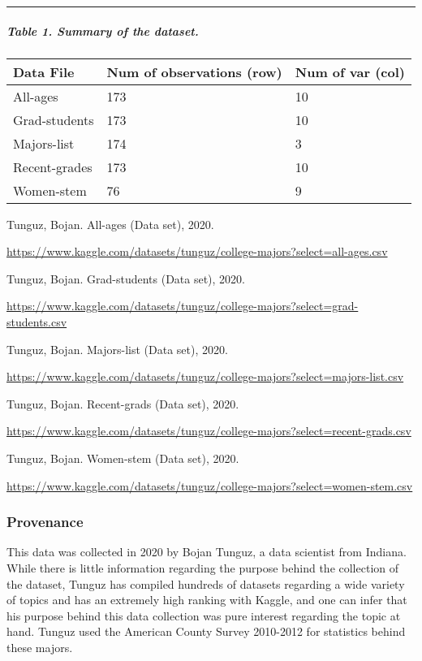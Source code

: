 \documentclass[
]{article}
\begin{document}
\begin{center}\rule{0.5\linewidth}{0.5pt}\end{center}

\hypertarget{table-1.-summary-of-the-dataset.}{%
\subparagraph{Table 1. Summary of the
dataset.}\label{table-1.-summary-of-the-dataset.}}

\begin{longtable}[]{@{}lll@{}}
\toprule()
Data File & Num of observations (row) & Num of var (col) \\
\midrule()
\endhead
All-ages & 173 & 10 \\
Grad-students & 173 & 10 \\
Majors-list & 174 & 3 \\
Recent-grades & 173 & 10 \\
Women-stem & 76 & 9 \\
\bottomrule()
\end{longtable}

Tunguz, Bojan. All-ages (Data set), 2020.

\url{https://www.kaggle.com/datasets/tunguz/college-majors?select=all-ages.csv}

Tunguz, Bojan. Grad-students (Data set), 2020.

\url{https://www.kaggle.com/datasets/tunguz/college-majors?select=grad-students.csv}

Tunguz, Bojan. Majors-list (Data set), 2020.

\url{https://www.kaggle.com/datasets/tunguz/college-majors?select=majors-list.csv}

Tunguz, Bojan. Recent-grads (Data set), 2020.

\url{https://www.kaggle.com/datasets/tunguz/college-majors?select=recent-grads.csv}

Tunguz, Bojan. Women-stem (Data set), 2020.

\url{https://www.kaggle.com/datasets/tunguz/college-majors?select=women-stem.csv}

\hypertarget{provenance}{%
\subsubsection{Provenance}\label{provenance}}

This data was collected in 2020 by Bojan Tunguz, a data scientist from
Indiana. While there is little information regarding the purpose behind
the collection of the dataset, Tunguz has compiled hundreds of datasets
regarding a wide variety of topics and has an extremely high ranking
with Kaggle, and one can infer that his purpose behind this data
collection was pure interest regarding the topic at hand. Tunguz used
the American County Survey 2010-2012 for statistics behind these majors.
\end{document}
